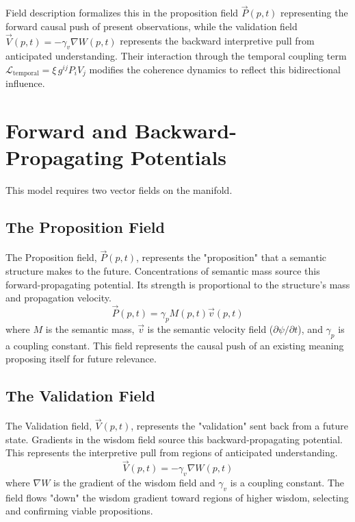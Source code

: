 Field description formalizes this in the proposition field $\vec{P}(p,t)$ representing the forward causal push of present observations, while the validation field $\vec{V}(p,t) = -\gamma_v \nabla W(p,t)$ represents the backward interpretive pull from anticipated understanding. Their interaction through the temporal coupling term $\mathcal{L}_{\text{temporal}} = \xi \, g^{ij} P_{i} V_{j}$ modifies the coherence dynamics to reflect this bidirectional influence. 

\section{Forward and Backward-Propagating Potentials}

This model requires two vector fields on the manifold.

\subsection{The Proposition Field}
The Proposition field, \(\vec{P}(p,t)\), represents the "proposition" that a semantic structure makes to the future. Concentrations of semantic mass source this forward-propagating potential. Its strength is proportional to the structure's mass and propagation velocity.
\begin{equation}
\vec{P}(p,t) = \gamma_p M(p,t) \vec{v}(p,t)
\end{equation}
where \(M\) is the semantic mass, \(\vec{v}\) is the semantic velocity field (\(\partial\psi/\partial t\)), and \(\gamma_p\) is a coupling constant. This field represents the causal push of an existing meaning proposing itself for future relevance.

\subsection{The Validation Field}
The Validation field, \(\vec{V}(p,t)\), represents the "validation" sent back from a future state. Gradients in the wisdom field source this backward-propagating potential. This represents the interpretive pull from regions of anticipated understanding.
\begin{equation}
\vec{V}(p,t) = -\gamma_v \nabla W(p,t)
\end{equation}
where \(\nabla W\) is the gradient of the wisdom field and \(\gamma_v\) is a coupling constant. The field flows "down" the wisdom gradient toward regions of higher wisdom, selecting and confirming viable propositions.

